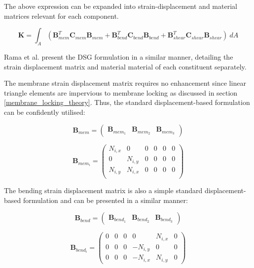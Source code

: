The above expression can be expanded into strain-displacement and material matrices relevant for each component.

\begin{equation} 
\mathbf{K} = \int_A  (\mathbf{B}_{mem}^T \mathbf{C}_{mem} \mathbf{B}_{mem} + \mathbf{B}_{bend}^T \mathbf{C}_{bend} \mathbf{B}_{bend} + \mathbf{B}_{shear}^T \mathbf{C}_{shear} \mathbf{B}_{shear})\ dA
\label{eqt5}
\end{equation}

Rama et al. \cite{Ram16} present the DSG formulation in a similar manner, detailing the strain displacement matrix and material material of each constituent separately.

The membrane strain displacement matrix requires no enhancement since linear triangle elements are impervious to membrane locking as discussed in section \ref{membrane_locking_theory}. Thus, the standard displacement-based formulation can be confidently utilised:

\begin{equation} 
\mathbf{B}_{mem} =  \begin{pmatrix}
\mathbf{B}_{mem_1} & \mathbf{B}_{mem_2} & \mathbf{B}_{mem_3}
\end{pmatrix} 
\label{eqt6}
\end{equation}

\begin{equation} 
\mathbf{B}_{mem_i} =  \begin{pmatrix}
N_{i,x} & 0 & 0 & 0 & 0 & 0 \\
0 & N_{i,y} & 0 & 0 & 0 & 0 \\
N_{i,y} & N_{i,x} & 0 & 0 & 0 & 0 \\
\end{pmatrix} 
\label{eqt7}
\end{equation}

The bending strain displacement matrix is also a simple standard displacement-based formulation and can be presented in a similar manner:

\begin{equation} 
\mathbf{B}_{bend} =  \begin{pmatrix}
\mathbf{B}_{bend_1} & \mathbf{B}_{bend_2} & \mathbf{B}_{bend_3}
\end{pmatrix} 
\label{eqt8}
\end{equation}

\begin{equation} 
\mathbf{B}_{bend_i} =  \begin{pmatrix}
0 & 0 & 0 & 0 & N_{i,x} & 0 \\
0 & 0 & 0 & -N_{i,y} & 0 & 0 \\
0 & 0 & 0 & -N_{i,x} & N_{i,y} & 0
\end{pmatrix} 
\label{eqt9}
\end{equation}

